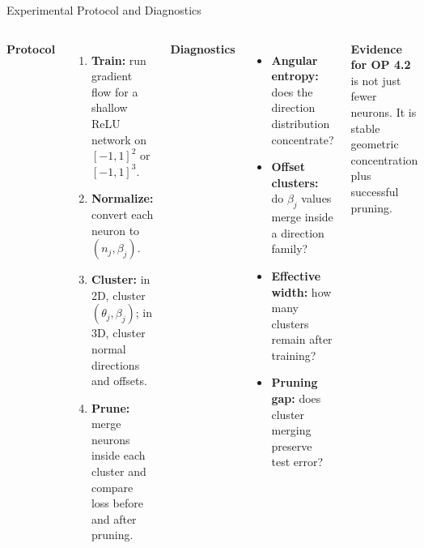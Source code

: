 \documentclass[aspectratio=169,10pt]{beamer}
\begin{document}
\begin{frame}{Experimental Protocol and Diagnostics}
\small
\begin{columns}[T,onlytextwidth]
\textbf{\textcolor{rtgnavy}{Protocol}}
\begin{enumerate}
  \item \textbf{Train:} run gradient flow for a shallow ReLU network on $[-1,1]^2$ or $[-1,1]^3$.
  \item \textbf{Normalize:} convert each neuron to $(n_j,\beta_j)$.
  \item \textbf{Cluster:} in 2D, cluster $(\theta_j,\beta_j)$; in 3D, cluster normal directions and offsets.
  \item \textbf{Prune:} merge neurons inside each cluster and compare loss before and after pruning.
\end{enumerate}

\textbf{\textcolor{rtgnavy}{Diagnostics}}
\begin{itemize}
  \item \textbf{Angular entropy:} does the direction distribution concentrate?
  \item \textbf{Offset clusters:} do $\beta_j$ values merge inside a direction family?
  \item \textbf{Effective width:} how many clusters remain after training?
  \item \textbf{Pruning gap:} does cluster merging preserve test error?
\end{itemize}

\vspace{0.08cm}
\begin{tcolorbox}[slideboxA]
\centering\textbf{Evidence for OP 4.2} is not just fewer neurons. It is stable geometric concentration plus successful pruning.
\end{tcolorbox}
\end{columns}
\end{frame}
\end{document}

